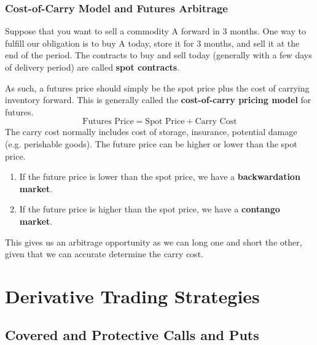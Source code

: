 \documentclass{article}
\begin{document}
\subsubsection{Cost-of-Carry Model and Futures Arbitrage}

Suppose that you want to sell a commodity A forward in 3 months. One way to fulfill our obligation is to buy A today, store it for 3 months, and sell it at the end of the period. The contracts to buy and sell today (generally with a few days of delivery period) are called \textbf{spot contracts}. 

\begin{definition}
As such, a futures price should simply be the spot price plus the cost of carrying inventory forward. This is generally called the \textbf{cost-of-carry pricing model} for futures. 
\[\text{Futures Price} = \text{Spot Price} + \text{Carry Cost}\]
The carry cost normally includes cost of storage, insurance, potential damage (e.g. perishable goods). The future price can be higher or lower than the spot price. 
\begin{enumerate}
    \item If the future price is lower than the spot price, we have a \textbf{backwardation market}. 
    \item If the future price is higher than the spot price, we have a \textbf{contango market}. 
\end{enumerate}
This gives us an arbitrage opportunity as we can long one and short the other, given that we can accurate determine the carry cost. 
\end{definition}


\section{Derivative Trading Strategies}

\subsection{Covered and Protective Calls and Puts}
\end{document}
